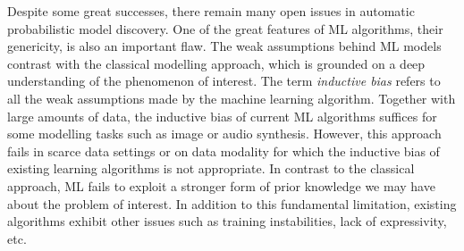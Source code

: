 Despite some great successes, there remain many open issues in automatic probabilistic model discovery. One of the great features of ML algorithms, their genericity, is also an important flaw. The weak assumptions behind ML models contrast with the classical modelling approach, which is grounded on a deep understanding of the phenomenon of interest. The term \textit{inductive bias} refers to all the weak assumptions made by the machine learning algorithm. Together with large amounts of data, the inductive bias of current ML algorithms suffices for some modelling tasks such as image or audio synthesis. However, this approach fails in scarce data settings or on data modality for which the inductive bias of existing learning algorithms is not appropriate. In contrast to the classical approach, ML fails to exploit a stronger form of prior knowledge we may have about the problem of interest. In addition to this fundamental limitation, existing algorithms exhibit other issues such as training instabilities, lack of expressivity, etc.


